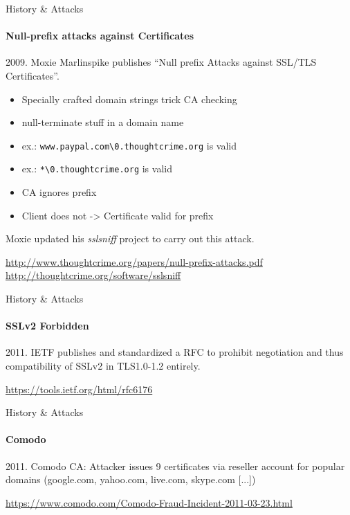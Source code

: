 \documentclass[hyperref={draft}]{beamer}
\begin{document}
\begin{frame}{History \& Attacks}
  \framesubtitle{Null-prefix attacks against Certificates}
  2009. Moxie Marlinspike publishes ``Null prefix Attacks against SSL/TLS Certificates''.

  \begin{itemize}
    \item Specially crafted domain strings trick CA checking
    \item null-terminate stuff in a domain name
    \item ex.: \texttt{www.paypal.com\textbackslash0.thoughtcrime.org} is valid
    \item ex.: \texttt{*\textbackslash0.thoughtcrime.org} is valid
    \item CA ignores prefix 
    \item Client does not -> Certificate valid for prefix
  \end{itemize}
  Moxie updated his \emph{sslsniff} project to carry out this attack.
  
  \vspace{30px}

  \tiny
  \url{http://www.thoughtcrime.org/papers/null-prefix-attacks.pdf}\\
  \url{http://thoughtcrime.org/software/sslsniff}
\end{frame}


\begin{frame}{History \& Attacks}
  \framesubtitle{SSLv2 Forbidden}
  2011. IETF publishes and standardized a RFC to prohibit negotiation and thus compatibility of SSLv2 in TLS1.0-1.2 entirely. 
  
  \vspace{140px}

  \tiny
  \url{https://tools.ietf.org/html/rfc6176}
\end{frame}

\begin{frame}{History \& Attacks}
  \framesubtitle{Comodo}
  2011. Comodo CA: Attacker issues 9 certificates via reseller account for popular domains (google.com, yahoo.com, live.com, skype.com [...])
  
  \vspace{160px}

  \tiny
  \url{https://www.comodo.com/Comodo-Fraud-Incident-2011-03-23.html}
\end{frame}
\end{document}
